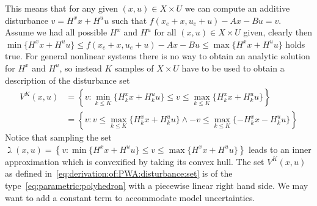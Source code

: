 %
This means that for any given $(x,u)\in X\times U$ we can compute an additive disturbance $v=H^x x + H^u u$
such that $f(x_e+x,u_e+u)-Ax-Bu = v$.
%
Assume we had all possible $H^x$ and $H^u$ for all $(x,u)\in X\times U$ given, clearly then 
$\min\{H^x x + H^u u\} \leq f(x_e+x,u_e+u)-Ax-Bu \leq \max\{H^x x + H^u u\}$ holds true.
%
For general nonlinear systems there is no way to obtain an analytic solution for $H^x$ and $H^u$,
so instead $K$ samples of $X\times U$ have to be used to obtain a description of 
the disturbance set
%
\begin{equation}\label{eq:derivation:of:PWA:disturbance:set}
\begin{split}
	V^K(x,u) &= \left\{v: \min_{k\leq K}\{H^x_k x + H^u_k u\} \leq v \leq \max_{k\leq K}\{H^x_k x + H^u_k u\} \right\}\\
	&= \left\{v: v \leq \max_{k\leq K}\{H^x_k x + H^u_k u\} \wedge -v \leq \max_{k\leq K}\{-H^x_k x - H^u_k u\} \right\}
\end{split}
\end{equation}
%
Notice that sampling the set $\gimel(x,u) = \left\{v : \min\{H^x x + H^u u\} \leq v \leq \max\{H^x x + H^u u\}\right\}$ 
leads to an inner approximation which is convexified by taking its convex hull.
%
The set $V^K(x,u)$ as defined in~\eqref{eq:derivation:of:PWA:disturbance:set} is of the
type~\eqref{eq:parametric:polyhedron} with a piecewise linear right hand side. We may
want to add a constant term to accommodate model uncertainties.
%
%
%
%
